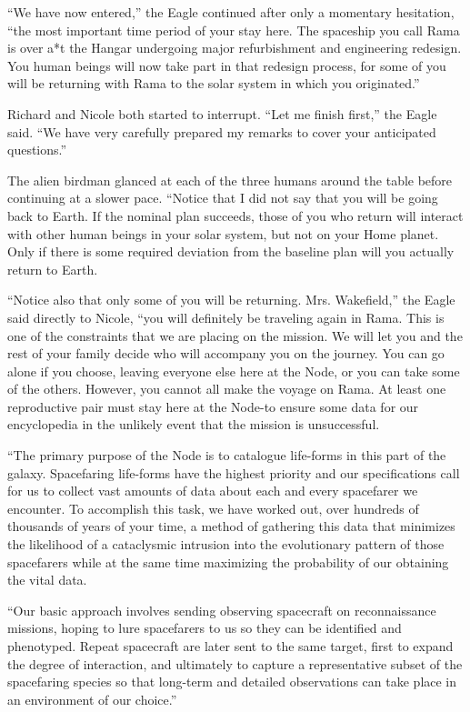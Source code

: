 \documentclass[]{article}
\begin{document}
{“We have now entered,” the Eagle continued after only a momentary hesitation, “the most important time period of your stay here. The spaceship you call Rama is over a*t the Hangar undergoing major refurbishment and engineering redesign. You human beings will now take part in that redesign process, for some of you will be returning with Rama to the solar system in which you originated.”

Richard and Nicole both started to interrupt. “Let me finish first,” the Eagle said. “We have very carefully prepared my remarks to cover your anticipated questions.”

The alien birdman glanced at each of the three humans around the table before continuing at a slower pace. “Notice that I did not say that you will be going back to Earth. If the nominal plan succeeds, those of you who return will interact with other human beings in your solar system, but not on your Home planet. Only if there is some required deviation from the baseline plan will you actually return to Earth.

“Notice also that only some of you will be returning. Mrs. Wakefield,” the Eagle said directly to Nicole, “you will definitely be traveling again in Rama. This is one of the constraints that we are placing on the mission. We will let you and the rest of your family decide who will accompany you on the journey. You can go alone if you choose, leaving everyone else here at the Node, or you can take some of the others. However, you cannot all make the voyage on Rama. At least one reproductive pair must stay here at the Node-to ensure some data for our encyclopedia in the unlikely event that the mission is unsuccessful.

“The primary purpose of the Node is to catalogue life-forms in this part of the galaxy. Spacefaring life-forms have the highest priority and our specifications call for us to collect vast amounts of data about each and every spacefarer we encounter. To accomplish this task, we have worked out, over hundreds of thousands of years of your time, a method of gathering this data that minimizes the likelihood of a cataclysmic intrusion into the evolutionary pattern of those spacefarers while at the same time maximizing the probability of our obtaining the vital data.

“Our basic approach involves sending observing spacecraft on reconnaissance missions, hoping to lure spacefarers to us so they can be identified and phenotyped. Repeat spacecraft are later sent to the same target, first to expand the degree of interaction, and ultimately to capture a representative subset of the spacefaring species so that long-term and detailed observations can take place in an environment of our choice.”

}
\end{document}
